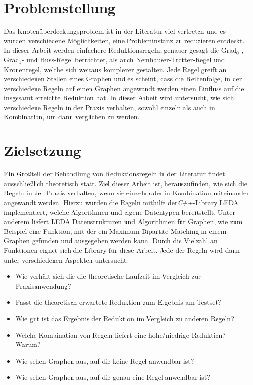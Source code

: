 \section{Problemstellung}
\label{ch:Einleitung:sec:Problemstellung}

Das Knotenüberdeckungsproblem ist in der Literatur viel vertreten und es wurden verschiedene Möglichkeiten, eine Probleminstanz zu reduzieren entdeckt. In dieser Arbeit werden einfachere Reduktionsregeln, genauer gesagt die Grad$_{0}$-, Grad$_{1}$- und Buss-Regel betrachtet, als auch Nemhauser-Trotter-Regel und Kronenregel, welche sich weitaus komplexer gestalten. Jede Regel greift an verschiedenen Stellen eines Graphen und es scheint, dass die Reihenfolge, in der verschiedene Regeln auf einen Graphen angewandt werden einen Einfluss auf die insgesamt erreichte Reduktion hat. In dieser Arbeit wird untersucht, wie sich verschiedene Regeln in der Praxis verhalten, sowohl einzeln als auch in Kombination, um dann verglichen zu werden. 

\section{Zielsetzung}
\label{ch:Einleitung:sec:Zielsetzung}

Ein Großteil der Behandlung von Reduktionsregeln in der Literatur findet ausschließlich theoretisch statt.
Ziel dieser Arbeit ist, herauszufinden, wie sich die Regeln in der Praxis verhalten, wenn sie einzeln oder in Kombination miteinander angewandt werden. Hierzu wurden die Regeln mithilfe der\emph{C++}-Library LEDA \cite{manual} implementiert, welche Algorithmen und eigene Datentypen bereitstellt. Unter anderem liefert LEDA Datenstrukturen und Algorithmen für Graphen, wie zum Beispiel eine Funktion, mit der ein Maximum-Bipartite-Matching in einem Graphen gefunden und ausgegeben werden kann. Durch die Vielzahl an Funktionen eignet sich die Library für diese Arbeit. Jede der  Regeln wird dann unter verschiedenen Aspekten untersucht:
\begin{itemize}
\item Wie verhält sich die die theoretische Laufzeit im Vergleich zur Praxisanwendung?
\item Passt die theoretisch erwartete Reduktion zum Ergebnis am Testset?
\item Wie gut ist das Ergebnis der Reduktion im Vergleich zu anderen Regeln?
\item Welche Kombination von Regeln liefert eine hohe/niedrige Reduktion? Warum?
\item Wie sehen Graphen aus, auf die keine Regel anwendbar ist?
\item Wie sehen Graphen aus, auf die genau eine Regel anwendbar ist?
\end{itemize}


